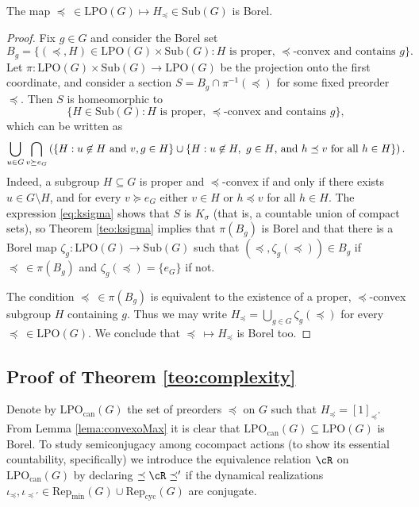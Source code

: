 \documentclass[reqno]{amsart}
\begin{document}
\begin{lema} \label{lema:convexoMax}
	The map $\preceq \  \in \mathrm{LPO}(G) \mapsto H_\preceq \in \mathrm{Sub}(G)$ is Borel.
\end{lema}
\begin{proof}
Fix $g \in G$ and consider the Borel set
\[
	B_g = \{(\preceq, H) \in \mathrm{LPO}(G) \times \mathrm{Sub}(G) : \text{$H$ is proper, $\preceq$-convex and contains $g$}\}.
\]
Let $\pi \colon \mathrm{LPO}(G) \times \mathrm{Sub}(G) \to \mathrm{LPO}(G)$ be the projection onto the first coordinate, and consider a section $S = B_g \cap \pi^{-1}(\preceq)$ for some fixed preorder $\preceq$. Then $S$ is homeomorphic to
\[
	\{H \in \mathrm{Sub}(G) : \text{$H$ is proper, $\preceq$-convex and contains $g$}\},
\]
which can be written as
\begin{equation} \label{eq:ksigma}
	\bigcup_{u \in G} \bigcap_{v \succeq e_G}\left( \{ H : u \not \in H\text{ and }v,g \in H\} \cup \{H : \text{$u \not \in H,$\,  $g \in H$, and $h \preceq v$ for all $h \in H$}\} \right).
\end{equation}
Indeed, a subgroup $H \subseteq G$ is proper and $\preceq$-convex if and only if there exists $u \in G \setminus H$, and for every $v \succeq e_G$ either $v \in H$ or $h \preceq v$ for all $h \in H$. The expression \eqref{eq:ksigma} shows that $S$ is $K_\sigma$ (that is, a countable union of compact sets), so Theorem \ref{teo:ksigma} implies that $\pi(B_g)$ is Borel and that there is a Borel map $\zeta_g \colon \mathrm{LPO}(G) \to \mathrm{Sub}(G)$ such that $(\preceq, \zeta_g(\preceq)) \in B_g$ if $\preceq \ \in \pi(B_g)$ and $\zeta_g(\preceq) = \{e_G\}$ if not.

The condition $\preceq \ \in \pi(B_g)$ is equivalent to the existence of a proper, $\preceq$-convex subgroup $H$ containing $g$. Thus we may write $H_\preceq = \bigcup_{g \in G}\zeta_g(\preceq)$ for every $\preceq \ \in \mathrm{LPO}(G)$. We conclude that $\preceq \ \mapsto H_\preceq$ is Borel too.
\end{proof}

\subsection{Proof of Theorem \ref{teo:complexity}} \label{subsection:essentiallyCountable}
Denote by $\mathrm{LPO}_\mathrm{can}(G)$ the set of preorders $\preceq$ on $G$ such that $H_\preceq = [1]_\preceq$. From Lemma \ref{lema:convexoMax} it is clear that $\mathrm{LPO}_\mathrm{can}(G) \subseteq \mathrm{LPO}(G)$ is Borel. To study semiconjugacy among cocompact actions (to show its essential countability, specifically) we introduce the equivalence relation $\cR$ on $\mathrm{LPO}_\mathrm{can}(G)$ by declaring $\preceq \cR \preceq'$ if the dynamical realizations $\iota_\preceq, \iota_{\preceq'} \in \mathrm{Rep}_\mathrm{min}(G) \cup \mathrm{Rep}_\mathrm{cyc}(G)$ are conjugate.
\end{document}
